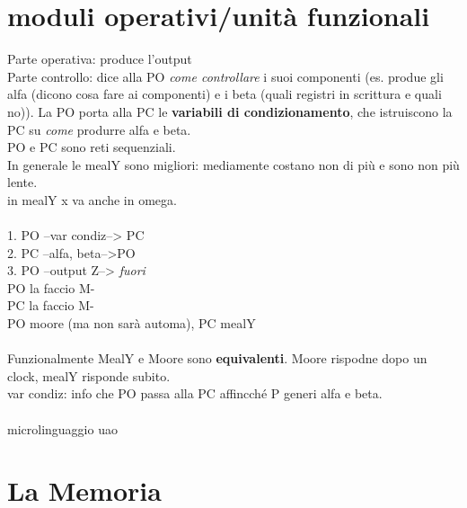 \documentclass[10pt]{report}
\begin{document}
\section{moduli operativi/unità funzionali}
Parte operativa: produce l'output\\
Parte controllo: dice alla PO \textit{come controllare} i suoi componenti (es. produe gli alfa (dicono cosa fare ai componenti) e i beta (quali registri in scrittura e quali no)). La PO porta alla PC le \textbf{variabili di condizionamento}, che istruiscono la PC su \textit{come} produrre alfa e beta.\\
PO e PC sono reti sequenziali.\\
In generale le mealY sono migliori: mediamente costano non di più e sono non più lente.\\
in mealY x va anche in omega.\\\\
1. PO --var condiz--> PC\\2. PC --alfa, beta-->PO\\3. PO --output Z--> \textit{fuori}\\
PO la faccio M-\\
PC la faccio M-\\
PO moore (ma non sarà automa), PC mealY\\\\
Funzionalmente MealY e Moore sono \textbf{equivalenti}. Moore rispodne dopo un clock, mealY risponde subito.\\
var condiz: info che PO passa alla PC affincché P generi alfa e beta.\\\\
microlinguaggio uao\\
\section{La Memoria}
\end{document}
